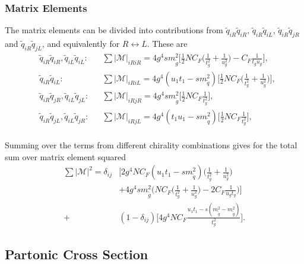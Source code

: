 \documentclass[twoside,english]{uiofysmaster}
\begin{document}
\subsubsection{Matrix Elements}

The matrix elements can be divided into contributions from $\tilde{q}_{iR} \tilde{q}_{iR}$, $\tilde{q}_{iR} \tilde{q}_{iL}$, $\tilde{q}_{iR} \tilde{q}_{jR}$ and $\tilde{q}_{iR} \tilde{q}_{jL}$, and equivalently for $R \leftrightarrow L$. These are
\begin{align}
&\tilde{q}_{iR} \tilde{q}_{iR}, \tilde{q}_{iL} \tilde{q}_{iL}: && \sum |\mathcal{M}|_{iRiR} = 4g^4 s m_{\tilde{g}}^2 \Big[ \frac{1}{2} NC_F\Big( \frac{1}{t_g^2} + \frac{1}{u_g^2} \Big) - C_F \frac{1}{t_gu_g} \Big],\\
&\tilde{q}_{iR} \tilde{q}_{iL}: &&\sum |\mathcal{M}|_{iRiL}=  4 g^4 (u_1t_1 - sm_{\tilde{q}}^2) \Big[ \frac{1}{2}NC_F \Big( \frac{1}{t_g^2} + \frac{1}{u_g^2} \Big) \Big],\\
& \tilde{q}_{iR} \tilde{q}_{jR}, \tilde{q}_{iL} \tilde{q}_{jL}: && \sum |\mathcal{M}|_{iRjR} = 4 g^4 sm_{\tilde{g}}^2 \Big[\frac{1}{2} NC_F \frac{1}{t_g^2}  \Big],\\
& \tilde{q}_{iR} \tilde{q}_{jL}, \tilde{q}_{iL} \tilde{q}_{jR}: && \sum |\mathcal{M}|_{iRjL} = 4 g^4 (t_1u_1 - sm_{\tilde{q}}^2) \Big[\frac{1}{2} NC_F \frac{1}{t_g^2}  \Big],\\
\end{align}

Summing over the terms from different chirality combinations gives  for the total sum over matrix element squared 
\begin{align}
\sum |\mathcal{M}|^2 = \delta_{ij} & \Bigg[2 g^4NC_F(u_1t_1-sm_{\tilde{q}}^2) \Big( \frac{1}{t_g^2} + \frac{1}{u_g^2} \Big) \nonumber \\& + 4 g^4 sm_{\tilde{g}}^2 \Big( NC_F \Big(\frac{1}{t_g^2} + \frac{1}{u_g^2}\Big) -2C_F\frac{1}{u_gt_g} \Big) \Bigg] \nonumber \\
+& (1-\delta_{ij})\Bigg[4g^4NC_F  \frac{u_1t_1-s(m_{\tilde{g}}^2-m_{\tilde{g}}^2)}{t_g^2} \Bigg].
\end{align}



\subsection*{Partonic Cross Section}
\end{document}
